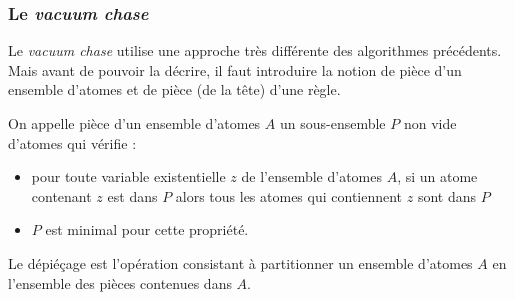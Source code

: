 \subsubsection{Le \textit{vacuum chase}}\label{sec:vacuum_chase}

Le \textit{vacuum chase} utilise une approche très différente des algorithmes précédents. Mais avant de pouvoir la décrire, il faut introduire la notion de pièce d'un ensemble d'atomes et de pièce (de la tête) d'une règle.
\begin{definition}\label{def:piece_atomes}
    On appelle pièce d’un ensemble d'atomes $A$ un sous-ensemble $P$ non vide d’atomes qui vérifie : 
    \begin{itemize}
        \item pour toute variable existentielle $z$ de l'ensemble d'atomes $A$, si un atome contenant $z$ est dans $P$ alors tous les atomes qui contiennent $z$ sont dans $P$ 
        \item $P$ est minimal pour cette propriété.
    \end{itemize}
Le dépiéçage est l'opération consistant à partitionner un ensemble d'atomes $A$ en l'ensemble des pièces contenues dans $A$.
\end{definition}

